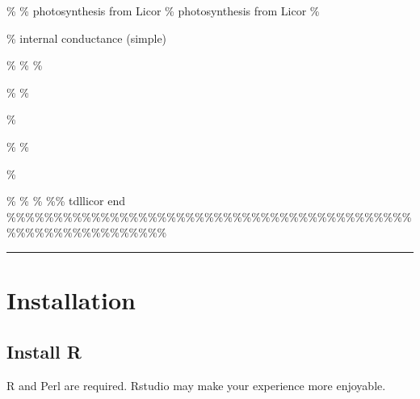 \documentclass[]{article}
\begin{document}
\% \newcommand{\sAL}{A_{}} \% photosynthesis from Licor
\newcommand{\sdataAL}{\tilde{A}_{}} \% photosynthesis from Licor
\newcommand{\ssigAL}{\sigma_{A}^2} \%

\newcommand{\sgm}{g_{\textrm{m}\subctp}}

\% internal conductance (simple)

\newcommand{\sE}{E_{\subctp}}

\% \newcommand{\sdataE}{\tilde{E}_{}} \%
\newcommand{\ssigE}{\sigma_{E}^2} \%

\newcommand{\sgsc}{g_{\textrm{sc}}}

\% \newcommand{\sdotgsc}{\dot{g}_{\textrm{sc}}} \%

\renewcommand{\sgsc}{\sdotgsc}

\%

\newcommand{\sgbc}{g_{\textrm{bc}}}

\% \newcommand{\sdotgbc}{\dot{g}_{\textrm{bc}}} \%

\renewcommand{\sgbc}{\sdotgbc}

\%

\newcommand{\sgtc}{g_{\textrm{tc}\subctp}}

\% \newcommand{\sdatagtc}{\tilde{g}_{\textrm{tc}}} \%
\newcommand{\ssiggtc}{\sigma_{g_{\textrm{tc}}}^2} \% \%\% tdllicor end
\%\%\%\%\%\%\%\%\%\%\%\%\%\%\%\%\%\%\%\%\%\%\%\%\%\%\%\%\%\%\%\%\%\%\%\%\%\%\%\%\%\%\%\%\%\%\%\%\%\%\%\%\%\%\%\%\%\%\%\%

\begin{center}\rule{0.5\linewidth}{\linethickness}\end{center}

\hypertarget{installation}{%
\section{Installation}\label{installation}}

\hypertarget{install-r}{%
\subsection{Install R}\label{install-r}}

R and Perl are required. Rstudio may make your experience more
enjoyable.
\end{document}
